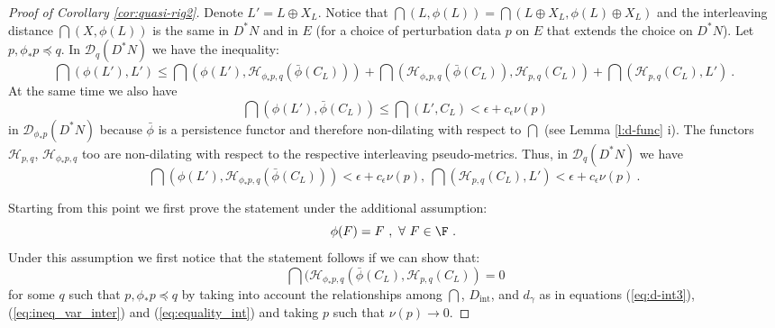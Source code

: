 \begin{proof}[Proof of Corollary \ref{cor:quasi-rig2}]
Denote $L'=L\oplus X_{L}$.  Notice that $\dint(L,\phi(L))= \dint(L\oplus X_{L},\phi (L)\oplus X_{L})$ and the interleaving distance $\dint(X,\phi(L))$ is the same in $D^{\ast}N$ and in $E$ (for a choice of perturbation data $p$ on $E$ that extends the choice on $D^{\ast}N$). Let $p, \phi_{\ast}p \preceq q$.
In $\mathscr{D}_{q}(D^{\ast}N)$ we have the inequality: 
$$\dint(\phi(L'),L')\leq \dint(\phi(L'), \mathcal{H}_{\phi_{\ast}p, q}(\bar{\phi}(C_{L})) )+\dint(\mathcal{H}_{\phi_{\ast}p, q}(\bar{\phi}(C_{L})) ,\mathcal{H}_{p,q}(C_{L}))
+\dint( \mathcal{H}_{p,q}(C_{L}),  L')~.~$$
At the same time we also have
$$ \dint(\phi(L'), \bar{\phi}(C_{L}) ) \leq \dint(L',C_{L}) < \epsilon +c_{\epsilon}\nu(p) $$ 
in $\mathscr{D}_{\phi_{\ast}p} (D^{\ast}N)$
because $\bar{\phi}$ is a persistence functor and therefore non-dilating with respect to $\dint$ (see Lemma \ref{l:d-func} i).
The functors $\mathcal{H}_{p,q}$, $\mathcal{H}_{\phi_{\ast}p,q}$  too are non-dilating  with respect to the respective interleaving pseudo-metrics.
 Thus,  in $\mathscr{D}_{q}(D^{\ast}N)$ we have 
$$ \dint(\phi(L'), \mathcal{H}_{\phi_{\ast}p,q}(\bar{\phi}(C_{L}) )) < \epsilon+c_{\epsilon}\nu(p),\ \dint( \mathcal{H}_{p,q}(C_{L}), L') < \epsilon +c_{\epsilon}\nu(p)~.~$$ 

Starting from this point we  first prove the statement  under the additional 
assumption: \begin{equation}\label{eq:fix_F}
\phi(F)=F \ , \ \forall \ F\in \F ~.~\end{equation}
Under this assumption we first notice that the statement follows if we can show that:
\begin{equation}\label{eq:equality_tr_dist}
\dint (\mathcal{H}_{\phi_{\ast}p, q}(\bar{\phi}(C_{L}), \mathcal{H}_{p,q}(C_{L}))=0
 \end{equation}
 for some $q$ such that $p ,\phi_{\ast}p \preceq q$  by  taking into account the relationships among
$\dint$, $D_{\mathrm{int}}$, and $d_{\gamma}$ as  in equations (\ref{eq:d-int3}), (\ref{eq:ineq_var_inter}) and (\ref{eq:equality_int}) and taking $p$ such that $\nu(p)\to 0$.


\end{proof}
